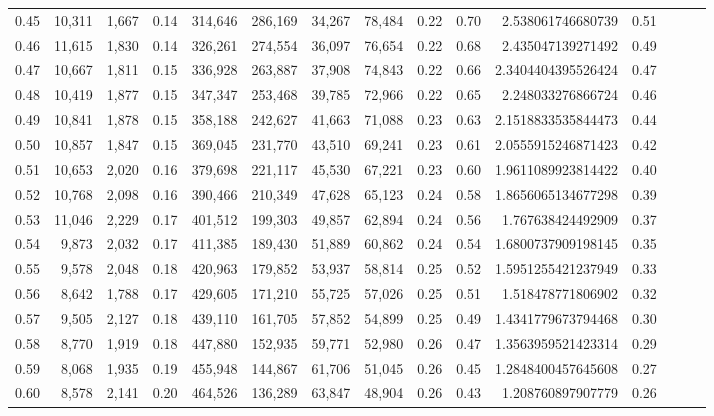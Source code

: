 \begin{tabular}{rrrrrrrrrrrrrrr}
0.45 &  10,311 &  1,667 &  0.14 &  314,646 &  286,169 &   34,267 &   78,484 &  0.22 &  0.70 &     2.538061746680739 &      0.51 \\
0.46 &  11,615 &  1,830 &  0.14 &  326,261 &  274,554 &   36,097 &   76,654 &  0.22 &  0.68 &     2.435047139271492 &      0.49 \\
0.47 &  10,667 &  1,811 &  0.15 &  336,928 &  263,887 &   37,908 &   74,843 &  0.22 &  0.66 &    2.3404404395526424 &      0.47 \\
0.48 &  10,419 &  1,877 &  0.15 &  347,347 &  253,468 &   39,785 &   72,966 &  0.22 &  0.65 &     2.248033276866724 &      0.46 \\
0.49 &  10,841 &  1,878 &  0.15 &  358,188 &  242,627 &   41,663 &   71,088 &  0.23 &  0.63 &    2.1518833535844473 &      0.44 \\
0.50 &  10,857 &  1,847 &  0.15 &  369,045 &  231,770 &   43,510 &   69,241 &  0.23 &  0.61 &    2.0555915246871423 &      0.42 \\
0.51 &  10,653 &  2,020 &  0.16 &  379,698 &  221,117 &   45,530 &   67,221 &  0.23 &  0.60 &    1.9611089923814422 &      0.40 \\
0.52 &  10,768 &  2,098 &  0.16 &  390,466 &  210,349 &   47,628 &   65,123 &  0.24 &  0.58 &    1.8656065134677298 &      0.39 \\
0.53 &  11,046 &  2,229 &  0.17 &  401,512 &  199,303 &   49,857 &   62,894 &  0.24 &  0.56 &     1.767638424492909 &      0.37 \\
0.54 &   9,873 &  2,032 &  0.17 &  411,385 &  189,430 &   51,889 &   60,862 &  0.24 &  0.54 &    1.6800737909198145 &      0.35 \\
0.55 &   9,578 &  2,048 &  0.18 &  420,963 &  179,852 &   53,937 &   58,814 &  0.25 &  0.52 &    1.5951255421237949 &      0.33 \\
0.56 &   8,642 &  1,788 &  0.17 &  429,605 &  171,210 &   55,725 &   57,026 &  0.25 &  0.51 &     1.518478771806902 &      0.32 \\
0.57 &   9,505 &  2,127 &  0.18 &  439,110 &  161,705 &   57,852 &   54,899 &  0.25 &  0.49 &    1.4341779673794468 &      0.30 \\
0.58 &   8,770 &  1,919 &  0.18 &  447,880 &  152,935 &   59,771 &   52,980 &  0.26 &  0.47 &    1.3563959521423314 &      0.29 \\
0.59 &   8,068 &  1,935 &  0.19 &  455,948 &  144,867 &   61,706 &   51,045 &  0.26 &  0.45 &    1.2848400457645608 &      0.27 \\
0.60 &   8,578 &  2,141 &  0.20 &  464,526 &  136,289 &   63,847 &   48,904 &  0.26 &  0.43 &     1.208760897907779 &      0.26 \\

\end{tabular}
